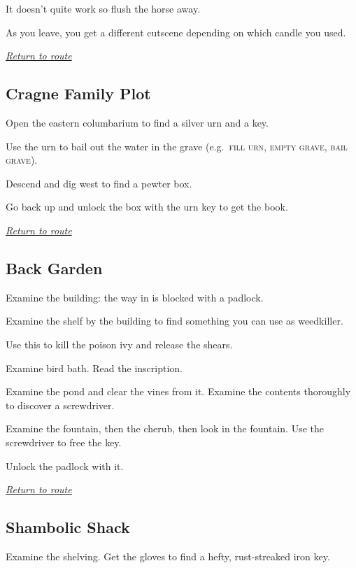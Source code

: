 \documentclass[a5paper]{extarticle}
\begin{document}
It doesn't quite work so flush the horse away.

As you leave, you get a different cutscene depending on which candle you used.

\hyperref[sec:route-3]{\emph{Return to route}}

\newpage
\subsection{Cragne Family Plot}\label{sec:sol-Cragne-Family-Plot}

Open the eastern columbarium to find a silver urn and a key.

Use the urn to bail out the water in the grave (e.g.~\textsc{fill urn},
\textsc{empty grave}, \textsc{bail grave}).

Descend and dig west to find a pewter box.

Go back up and unlock the box with the urn key to get the book.

\hyperref[sec:route-3]{\emph{Return to route}}

\newpage
\subsection{Back Garden}\label{sec:sol-Back-Garden}

Examine the building: the way in is blocked with a padlock.

Examine the shelf by the building to find something you can use as weedkiller.

Use this to kill the poison ivy and release the shears.

Examine bird bath. Read the inscription.

Examine the pond and clear the vines from it.
Examine the contents thoroughly to discover a screwdriver.

Examine the fountain, then the cherub, then look in the fountain.
Use the screwdriver to free the key.

Unlock the padlock with it.

\hyperref[sec:route-3]{\emph{Return to route}}

\newpage
\subsection{Shambolic Shack}\label{sec:sol-Shambolic-Shack-0}

Examine the shelving. Get the gloves to find a hefty, rust-streaked iron key.
\end{document}
